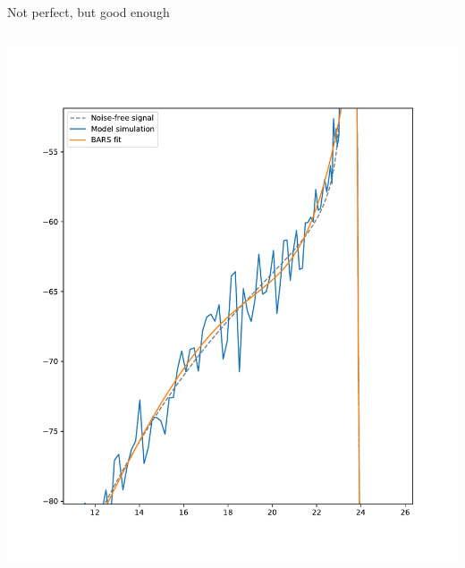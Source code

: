 \documentclass[presentation]{beamer}
\begin{document}
\begin{frame}[plain,label={sec:org38c56f4}]{Not perfect, but good enough}
\begin{columns}
\begin{column}{0.5\columnwidth}
\begin{center}
\includegraphics[width=1.1\textwidth]{./barsbad3.pdf}
\end{center}
\end{column}


\end{columns}
\end{frame}
\end{document}
